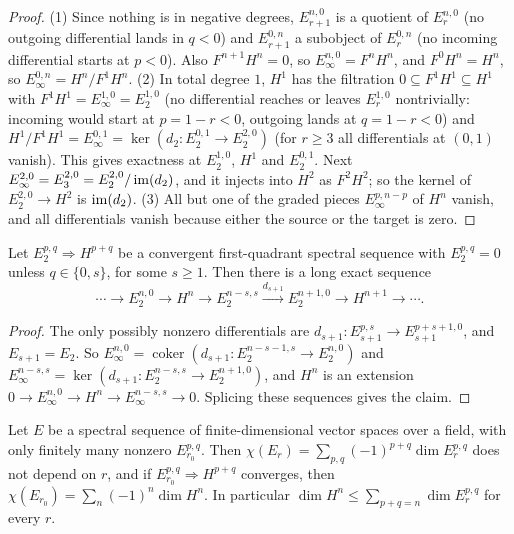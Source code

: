 \begin{proof}
(1) Since nothing is in negative degrees, $E_{r+1}^{n,0}$ is a quotient of $E_r^{n,0}$ (no outgoing differential lands in $q < 0$) and
$E_{r+1}^{0,n}$ a subobject of $E_r^{0,n}$ (no incoming differential starts at $p < 0$). Also $F^{n+1}H^n = 0$, so
$E_\infty^{n,0} = F^nH^n$, and $F^0H^n = H^n$, so $E_\infty^{0,n} = H^n/F^1H^n$.
(2) In total degree $1$, $H^1$ has the filtration $0 \subseteq F^1H^1 \subseteq H^1$ with $F^1H^1 = E_\infty^{1,0} = E_2^{1,0}$ (no differential
reaches or leaves $E_r^{1,0}$ nontrivially: incoming would start at $p = 1 - r < 0$, outgoing lands at $q = 1 - r < 0$) and
$H^1/F^1H^1 = E_\infty^{0,1} = \ker(d_2 \colon E_2^{0,1} \to E_2^{2,0})$ (for $r \geq 3$ all differentials at $(0,1)$ vanish). This gives
exactness at $E_2^{1,0}$, $H^1$ and $E_2^{0,1}$. Next $E_\infty^{2,0} = E_3^{2,0} = E_2^{2,0}/\operatorname{im}(d_2)$, and it injects into $H^2$ as
$F^2H^2$; so the kernel of $E_2^{2,0} \to H^2$ is $\operatorname{im}(d_2)$.
(3) All but one of the graded pieces $E_\infty^{p, n-p}$ of $H^n$ vanish, and all differentials vanish because either the source or the
target is zero.
\end{proof}

\begin{proposition}\label{spectral-sequences:proposition-two-rows}
Let $E_2^{p,q} \Rightarrow H^{p+q}$ be a convergent first-quadrant spectral sequence with $E_2^{p,q} = 0$ unless $q \in \{0, s\}$, for some
$s \geq 1$. Then there is a long exact sequence
\[
\cdots \to E_2^{n,0} \to H^n \to E_2^{n-s,s} \xrightarrow{d_{s+1}} E_2^{n+1,0} \to H^{n+1} \to \cdots.
\]
\end{proposition}

\begin{proof}
The only possibly nonzero differentials are $d_{s+1} \colon E_{s+1}^{p,s} \to E_{s+1}^{p+s+1,0}$, and $E_{s+1} = E_2$. So
$E_\infty^{n,0} = \operatorname{coker}(d_{s+1} \colon E_2^{n-s-1,s} \to E_2^{n,0})$ and $E_\infty^{n-s,s} = \ker(d_{s+1} \colon E_2^{n-s,s} \to E_2^{n+1,0})$, and $H^n$ is
an extension $0 \to E_\infty^{n,0} \to H^n \to E_\infty^{n-s,s} \to 0$. Splicing these sequences gives the claim.
\end{proof}

\begin{proposition}\label{spectral-sequences:proposition-euler-characteristic}
Let $E$ be a spectral sequence of finite-dimensional vector spaces over a field, with only finitely many nonzero $E_{r_0}^{p,q}$. Then $\chi(E_r) = \sum_{p,q}(-1)^{p+q}\dim E_r^{p,q}$ does not depend on $r$, and if
$E_{r_0}^{p,q} \Rightarrow H^{p+q}$ converges, then $\chi(E_{r_0}) = \sum_n(-1)^n\dim H^n$. In particular $\dim H^n \leq \sum_{p+q=n}\dim E_r^{p,q}$ for every $r$.
\end{proposition}

